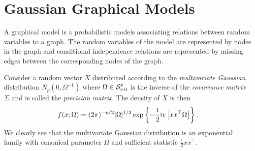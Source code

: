 \part{Gaussian Graphical Models}

A graphical model is a probabilistic models associating relations between random variables to a graph. The random variables of the model are represented by nodes in the graph and conditional independence relations are represented by missing edges between the corresponding nodes of the graph.

Consider a random vector $X$ distributed according to the \textit{multivariate Gaussian} distribution $N_p(0, \Omega^{-1})$ where $\Omega \in \S^p_{\succ 0}$ is the inverse of the \textit{covariance matrix} $\Sigma$ and is called the \textit{precision matrix}. The density of $X$ is then
\begin{equation} \label{eq-density-gaussian}
    f(x; \Omega) = (2\pi)^{-p/2} |\Omega|^{1/2} \expfc{-\frac{1}{2} \trB{xx^\top \Omega} }.
\end{equation}
We clearly see that the multivariate Gaussian distribution is an exponential family with canonical parameter $\Omega$ and sufficient statistic $\frac{1}{2}xx^\top$. 

